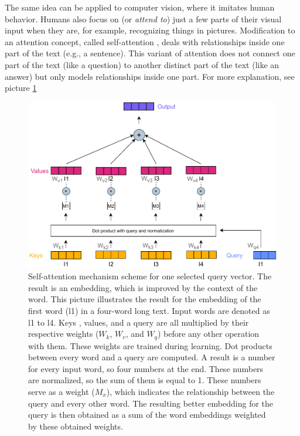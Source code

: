 The same idea can be applied to computer vision, where it imitates human behavior. Humans also focus on (or \textit{attend to}) just a few parts of their visual input when they are, for example, recognizing things in pictures.
Modification to an attention concept, called self-attention \citep{Cheng}, deals with relationships inside one part of the text (e.g., a sentence). This variant of attention does not connect one part of the text (like a question) to another distinct part of the text (like an answer) but only models relationships inside one part. For more explanation, see picture \ref{pic:att_self}
\begin{figure}[ht]
\centering
\includegraphics[width=1\columnwidth]{../img/self_attention1}
\caption{Self-attention mechanism scheme for one selected query vector. The result is an embedding, which is improved by the context of the word. This picture illustrates the result for the embedding %
of the first word (l1) in a four-word long text. Input words are denoted as l1 to l4. Keys , values, and a query are all multiplied by their respective weights ($W_k$, $W_v$, and $W_q$) before any other operation with them. These weights are trained during learning. Dot products between every word and a query are computed. A result is a number for every input word, so four numbers at the end. These numbers are normalized, so the sum of them is equal to 1. These numbers serve as a weight ($M_x$), which indicates the relationship between the query and every other word. The resulting better embedding for the query is then obtained as a sum of the word embeddings weighted by these obtained weights. %
}
\label{pic:att_self}
\end{figure}
